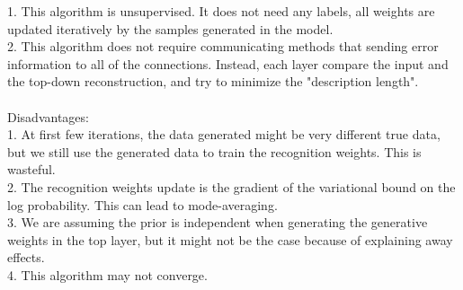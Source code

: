 \documentclass{article}
\begin{document}
1. This algorithm is unsupervised. It does not need any labels, all weights are updated iteratively by the samples generated in the model. \\
2. This algorithm does not require communicating methods that sending error information to all of the connections. Instead, each layer compare the input and the top-down reconstruction, and try to minimize the "description length".
\\
\\
Disadvantages: \\
1. At first few iterations, the data generated might be very different true data, but we still use the generated data to train the recognition weights. This is wasteful. \\
2. The recognition weights update is the gradient of the variational bound on the log probability. This can lead to mode-averaging. \\
3. We are assuming the prior is independent when generating the generative weights in the top layer, but it might not be the case because of explaining away effects. \\
4. This algorithm may not converge.
\end{document}
